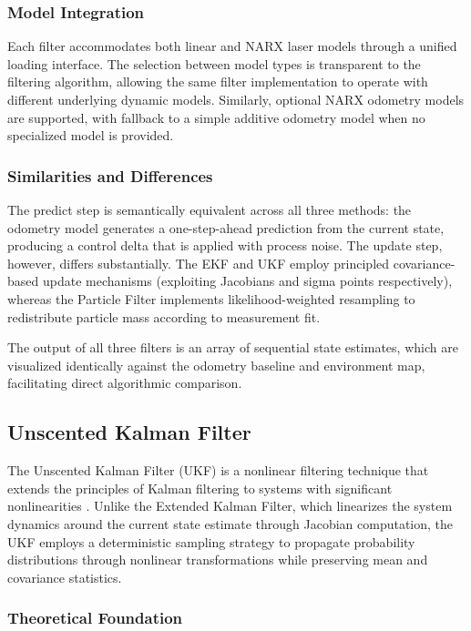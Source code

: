 \documentclass[conference]{IEEEtran}
\begin{document}
\subsubsection{Model Integration}

Each filter accommodates both linear and NARX laser models through a unified loading interface. The selection between model types is transparent to the filtering algorithm, allowing the same filter implementation to operate with different underlying dynamic models. Similarly, optional NARX odometry models are supported, with fallback to a simple additive odometry model when no specialized model is provided.

\subsubsection{Similarities and Differences}

The predict step is semantically equivalent across all three methods: the odometry model generates a one-step-ahead prediction from the current state, producing a control delta that is applied with process noise. The update step, however, differs substantially. The EKF and UKF employ principled covariance-based update mechanisms (exploiting Jacobians and sigma points respectively), whereas the Particle Filter implements likelihood-weighted resampling to redistribute particle mass according to measurement fit.

The output of all three filters is an array of sequential state estimates, which are visualized identically against the odometry baseline and environment map, facilitating direct algorithmic comparison.

\subsection{Unscented Kalman Filter} \label{sec:unscented_kalman_filter}

The Unscented Kalman Filter (UKF) is a nonlinear filtering technique that extends the principles of Kalman filtering to systems with significant nonlinearities \cite{Aguirre2007}. Unlike the Extended Kalman Filter, which linearizes the system dynamics around the current state estimate through Jacobian computation, the UKF employs a deterministic sampling strategy to propagate probability distributions through nonlinear transformations while preserving mean and covariance statistics.

\subsubsection{Theoretical Foundation}
\end{document}
